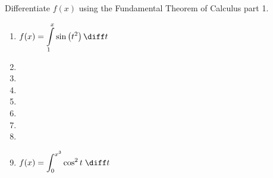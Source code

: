 Differentiate $f(x)$ using the Fundamental Theorem of Calculus part 1.
\begin{multicols}{2}
\begin{enumerate}[ref={\fcProblemRef}]
\item $\displaystyle f(x) = \int\limits_1^x \sin \left(t^2\right)  \diff t$

\item 
\item 
\item 
\item 
\item 
\item 
\item 
\item ${\displaystyle f(x) = \int_{0}^{x^3} \cos^2 t \; \diff t}$


\end{enumerate}
\end{multicols}